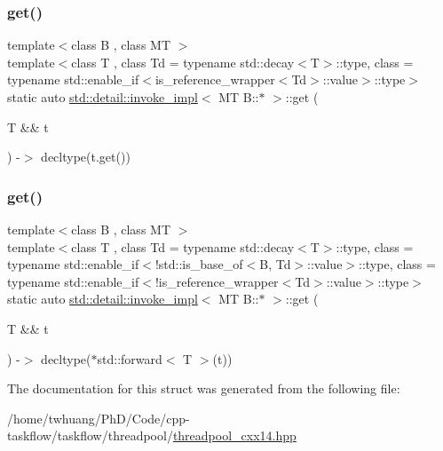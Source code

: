 \subsubsection{\texorpdfstring{get()}{get()}\hspace{0.1cm}{\footnotesize\ttfamily [2/3]}}
{\footnotesize\ttfamily template$<$class B , class MT $>$ \\
template$<$class T , class Td  = typename std\+::decay$<$\+T$>$\+::type, class  = typename std\+::enable\+\_\+if$<$is\+\_\+reference\+\_\+wrapper$<$\+Td$>$\+::value$>$\+::type$>$ \\
static auto \hyperlink{structstd_1_1detail_1_1invoke__impl}{std\+::detail\+::invoke\+\_\+impl}$<$ MT B\+::$\ast$ $>$\+::get (\begin{DoxyParamCaption}\item[{T \&\&}]{t }\end{DoxyParamCaption}) -\/$>$  decltype(t.\+get())\hspace{0.3cm}{\ttfamily [static]}}

\mbox{\label{structstd_1_1detail_1_1invoke__impl_3_01MT_01B_1_1_5_01_4_af1601009ad460178914b9cec095d8fca}} 
\subsubsection{\texorpdfstring{get()}{get()}\hspace{0.1cm}{\footnotesize\ttfamily [3/3]}}
{\footnotesize\ttfamily template$<$class B , class MT $>$ \\
template$<$class T , class Td  = typename std\+::decay$<$\+T$>$\+::type, class  = typename std\+::enable\+\_\+if$<$!std\+::is\+\_\+base\+\_\+of$<$\+B, Td$>$\+::value$>$\+::type, class  = typename std\+::enable\+\_\+if$<$!is\+\_\+reference\+\_\+wrapper$<$\+Td$>$\+::value$>$\+::type$>$ \\
static auto \hyperlink{structstd_1_1detail_1_1invoke__impl}{std\+::detail\+::invoke\+\_\+impl}$<$ MT B\+::$\ast$ $>$\+::get (\begin{DoxyParamCaption}\item[{T \&\&}]{t }\end{DoxyParamCaption}) -\/$>$  decltype($\ast$std\+::forward$<$ T $>$(t))\hspace{0.3cm}{\ttfamily [static]}}



The documentation for this struct was generated from the following file\+:\begin{DoxyCompactItemize}
\item 
/home/twhuang/\+Ph\+D/\+Code/cpp-\/taskflow/taskflow/threadpool/\hyperlink{threadpool__cxx14_8hpp}{threadpool\+\_\+cxx14.\+hpp}\end{DoxyCompactItemize}
